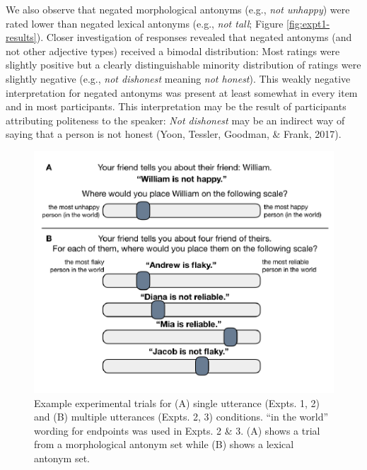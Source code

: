 \documentclass[floatsintext,doc]{apa6}
\begin{document}
We also observe that negated morphological antonyms (e.g., \emph{not unhappy}) were rated lower than negated lexical antonyms (e.g., \emph{not tall}; Figure \ref{fig:expt1-results}).
Closer investigation of responses revealed that negated antonyms (and not other adjective types) received a bimodal distribution: Most ratings were slightly positive but a clearly distinguishable minority distribution of ratings were slightly negative (e.g., \emph{not dishonest} meaning \emph{not honest}).
This weakly negative interpretation for negated antonyms was present at least somewhat in every item and in most participants.
This interpretation may be the result of participants attributing politeness to the speaker: \emph{Not dishonest} may be an indirect way of saying that a person is not honest (Yoon, Tessler, Goodman, \& Frank, 2017).

\begin{figure}[hbt]

{\centering \includegraphics[width=0.7\linewidth]{figs/experiment-slides-1} 

}

\caption{Example experimental trials for (A) single utterance (Expts. 1, 2) and (B) multiple utterances (Expts. 2, 3) conditions. ``in the world'' wording for endpoints was used in Expts. 2 \& 3. (A) shows a trial from a morphological antonym set while (B) shows a lexical antonym set.}\label{fig:experiment-slides}
\end{figure}
\end{document}
